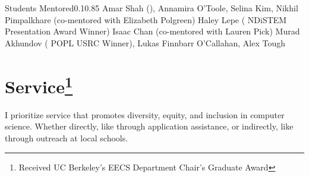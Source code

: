 \documentclass{federico_cv}
\begin{document}
\begin{tblSubSection}{Students Mentored}{0.1}{0.85}
{Amar Shah (),
Annamira O'Toole, Selina Kim, Nikhil Pimpalkhare (co-mentored with Elizabeth Polgreen)}
{Haley Lepe
(
{NDiSTEM  Presentation Award Winner})}
{Isaac Chan (co-mentored with Lauren Pick)}
{Murad Akhundov
(
{POPL  USRC Winner}), Lukas Finnbarr O'Callahan, Alex Tough}
\end{tblSubSection}


\section{Service\protect\footnote{Received UC Berkeley's EECS Department Chair's Graduate Award}}

I prioritize service that promotes diversity, equity, and inclusion in computer
science. Whether directly, like through application assistance, or
indirectly, like through outreach at local schools.
\end{document}
